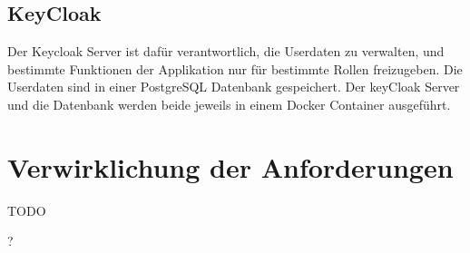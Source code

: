 \subsection{KeyCloak}

Der Keycloak Server ist dafür verantwortlich, die Userdaten zu verwalten, und bestimmte Funktionen der Applikation nur für bestimmte Rollen freizugeben. 
Die Userdaten sind in einer PostgreSQL Datenbank gespeichert. Der keyCloak Server und die Datenbank werden beide jeweils in einem Docker Container ausgeführt.

\section{Verwirklichung der Anforderungen}

TODO

?